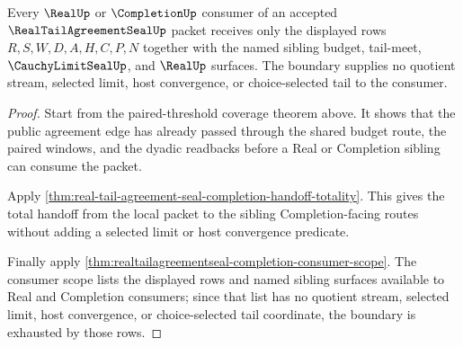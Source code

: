 \begin{theorem}
\label{thm:real-tail-agreement-seal-completion-consumer-boundary}
Every $\RealUp$ or $\CompletionUp$ consumer of an accepted $\RealTailAgreementSealUp$ packet receives only the displayed rows $R,S,W,D,A,H,C,P,N$ together with the named sibling budget, tail-meet, $\CauchyLimitSealUp$, and $\RealUp$ surfaces. The boundary supplies no quotient stream, selected limit, host convergence, or choice-selected tail to the consumer.
\end{theorem}
\begin{proof}
Start from the paired-threshold coverage theorem above. It shows that the public agreement edge has already passed through the shared budget route, the paired windows, and the dyadic readbacks before a Real or Completion sibling can consume the packet.

Apply \autoref{thm:real-tail-agreement-seal-completion-handoff-totality}. This gives the total handoff from the local packet to the sibling Completion-facing routes without adding a selected limit or host convergence predicate.

Finally apply \autoref{thm:realtailagreementseal-completion-consumer-scope}. The consumer scope lists the displayed rows and named sibling surfaces available to Real and Completion consumers; since that list has no quotient stream, selected limit, host convergence, or choice-selected tail coordinate, the boundary is exhausted by those rows.
\end{proof}

